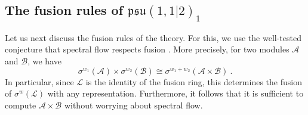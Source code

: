 \documentclass[12pt,a4paper]{article}
\newcommand{\be}{\begin{equation}}
\newcommand{\ee}{\end{equation}}
\begin{document}
\subsection{The fusion rules of $\mathfrak{psu}(1,1|2)_1$} \label{subsec:fusion rules}
Let us next discuss the fusion rules of the theory. For this, we use the well-tested conjecture that spectral flow respects fusion \cite{Gaberdiel:2001ny}. 
More precisely, for two modules $\mathscr{A}$ and $\mathscr{B}$, we have
\be 
\sigma^{w_1}(\mathscr{A}) \times \sigma^{w_2}(\mathscr{B}) \cong \sigma^{w_1+w_2}(\mathscr{A} \times \mathscr{B})\ . \label{eq:fusion spectral flow}
\ee
In particular, since $\mathscr{L}$ is the identity of the fusion ring, this determines the fusion of $\sigma^w(\mathscr{L})$ with any representation. Furthermore, it follows that it is sufficient to compute $\mathscr{A} \times \mathscr{B}$ without worrying about spectral flow.
\end{document}
